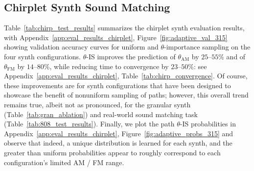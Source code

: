 \documentclass{article} %
\theoremstyle{plain}
\theoremstyle{definition}
\theoremstyle{remark}
\begin{document}
\subsection{Chirplet Synth Sound Matching}
\label{ssec:results_chirplet}
\vspace{-3pt}

Table~\ref{tab:chirp_test_results} summarizes the chirplet synth evaluation results, with Appendix~\ref{app:eval_results_chirplet}, Figure~\ref{fig:adaptive_val_315} showing validation accuracy curves for uniform and $\theta$-importance sampling on the four synth configurations.
$\theta$-IS improves the prediction of $\theta_{\mathrm{AM}}$ by $25$--$55\%$ and of $\theta_{\mathrm{FM}}$ by $14$--$80\%$, while reducing time to convergence by $23$--$50\%$: see Appendix~\ref{app:eval_results_chirplet}, Table~\ref{tab:chirp_convergence}.
Of course, these improvements are for synth configurations that have been designed to showcase the benefit of nonuniform sampling of paths; however, this overall trend remains true, albeit not as pronounced, for the granular synth (Table~\ref{tab:gran_ablation}) and real-world sound matching task (Table~\ref{tab:808_test_results}).
Finally, we plot the path $\theta$-IS probabilities in Appendix~\ref{app:eval_results_chirplet}, Figure~\ref{fig:adaptive_probs_315} and observe that indeed, a unique distribution is learned for each synth, and the greater than uniform probabilities appear to roughly correspond to each configuration's limited AM / FM range.
\vspace{-3pt}
\end{document}
